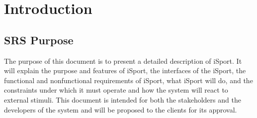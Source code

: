 \documentclass[16pt]{scrreprt}
\begin{document}
\chapter{Introduction}

\section{SRS Purpose}
The purpose of this document is to present a detailed description of iSport. It will explain the purpose and features of iSport, the interfaces of the iSport, the functional and nonfunctional requirements of iSport, what iSport will do, and the constraints under which it must operate and how the system will react to external stimuli. This document is intended for both the stakeholders and the developers of the system and will be proposed to the clients for its approval.
\end{document}

